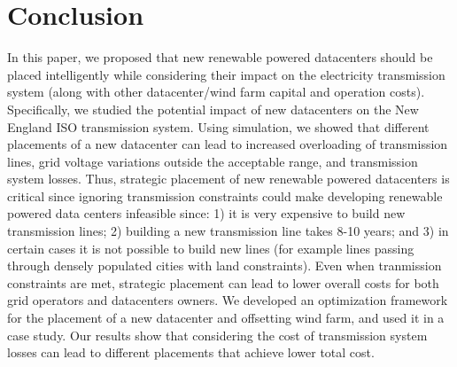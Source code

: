 \section{Conclusion}
\label{sec:conclusion}

In this paper, we proposed that new renewable powered datacenters should be placed intelligently while considering their impact on the electricity transmission system (along with other datacenter/wind farm capital and operation costs).  Specifically, we studied the potential impact of new datacenters on the New England ISO transmission system.  Using simulation, we showed that different placements of a new datacenter can lead to increased overloading of transmission lines, grid voltage variations outside the acceptable range, and transmission system losses.  Thus, strategic placement of new renewable powered datacenters is critical since ignoring transmission constraints could make developing renewable powered data centers infeasible since: 1) it is very expensive to build new transmission lines; 2) building a new transmission line takes 8-10 years; and 3) in certain cases it is not possible to build new lines (for example lines passing through densely populated cities with land constraints).  Even when tranmission constraints are met, strategic placement can lead to lower overall costs for both grid operators and datacenters owners.  We developed an optimization framework for the placement of a new datacenter and offsetting wind farm, and used it in a case study.  Our results show that considering the cost of transmission system losses can lead to different placements that achieve lower total cost.

